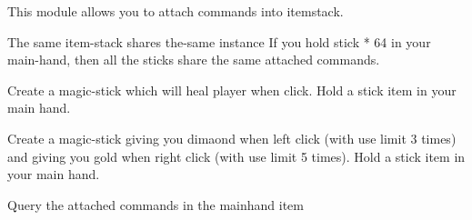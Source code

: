 
This module allows you to attach commands into itemstack.


\begin{note}{The same item-stack shares the-same instance}
    If you hold stick * 64 in your main-hand, then all the sticks share the same attached commands.
\end{note}

\begin{example}{Create a magic-stick which will heal player when click.}
    Hold a stick item in your main hand.\\
\end{example}

\begin{example}{Create a magic-stick giving you dimaond when left click (with use limit 3 times) and giving you gold when right click (with use limit 5 times).}
    Hold a stick item in your main hand.


\end{example}

\begin{example}{Query the attached commands in the mainhand item}
\end{example}
